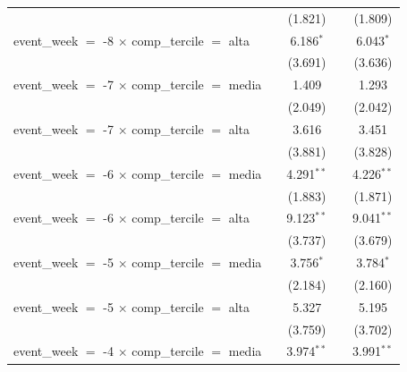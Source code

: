 \begin{tabular}{lcccc}
                                                           &                & (1.821)       &              & (1.809)\\   
   event\_week $=$ -8 $\times$ comp\_tercile $=$ alta      &                & 6.186$^{*}$   &              & 6.043$^{*}$\\   
                                                           &                & (3.691)       &              & (3.636)\\   
   event\_week $=$ -7 $\times$ comp\_tercile $=$ media     &                & 1.409         &              & 1.293\\   
                                                           &                & (2.049)       &              & (2.042)\\   
   event\_week $=$ -7 $\times$ comp\_tercile $=$ alta      &                & 3.616         &              & 3.451\\   
                                                           &                & (3.881)       &              & (3.828)\\   
   event\_week $=$ -6 $\times$ comp\_tercile $=$ media     &                & 4.291$^{**}$  &              & 4.226$^{**}$\\   
                                                           &                & (1.883)       &              & (1.871)\\   
   event\_week $=$ -6 $\times$ comp\_tercile $=$ alta      &                & 9.123$^{**}$  &              & 9.041$^{**}$\\   
                                                           &                & (3.737)       &              & (3.679)\\   
   event\_week $=$ -5 $\times$ comp\_tercile $=$ media     &                & 3.756$^{*}$   &              & 3.784$^{*}$\\   
                                                           &                & (2.184)       &              & (2.160)\\   
   event\_week $=$ -5 $\times$ comp\_tercile $=$ alta      &                & 5.327         &              & 5.195\\   
                                                           &                & (3.759)       &              & (3.702)\\   
   event\_week $=$ -4 $\times$ comp\_tercile $=$ media     &                & 3.974$^{**}$  &              & 3.991$^{**}$\\   

\end{tabular}
